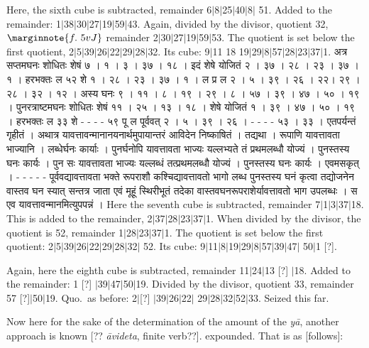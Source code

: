 \documentclass[11pt,a5paper]{book}
\def\ya{\textit{y\=a}}
\def\danda{$|$}
\begin{document}
{Here, the sixth cube is subtracted, remainder 6\danda 8\danda 25\danda 40\danda 8\danda
51. Added to the remainder: 1\danda 38\danda 30\danda 27\danda 19\danda 59\danda 43. Again, divided 
by the divisor, quotient 32,
$\marginnote{f.~5v J}$
remainder 2\danda 30\danda 27\danda 19\danda 59\danda 53. The quotient is set below the first
quotient, 2\danda 5\danda 39\danda 26\danda 22\danda 29\danda 28\danda 32. Its cube: 
9\danda 11 18 19\danda 29\danda 8\danda 57\danda 28\danda 23\danda 37\danda 1.
\newpage
{\s अत्र सप्तमघनः शोधितः शेषं ७ । १ । ३ । ३७ । १८ । 
इदं शेषे योजितं २ । ३७ । २८ । २३ । ३७ । १ । 
हरभक्तः ल ५२ शे १ । २८ । २३ । ३७ । १ । ल प्र ल २ । ५ । ३९ । २६ । २२। २९ । २८ । ३२ । १२ । 
अस्य घनः ९ । ११ । ८ । १९ । २९ । ८ । ५७ । ३९ । ४७ । ५० । १९ । 
पुनरत्राष्टमघनः शोधितः शेषं ११ । २५ । १३ । १८ । 
शेषे योजितं १ । ३९ । ४७ । ५० । १९ । 
हरभक्तः ल ३३ शे - - - - ५९ पू ल पूर्ववत् २ । ५ । ३९ । २६ । - - - - ५३ । ३३ । 
एतपर्यन्तं गृहीतं । अथात्र यावत्तावन्मानानयनार्थमुपायान्तरं आविदेन निष्काषितं । तद्यथा । 
रूपाणि यावत्तावता भाज्यानि । लब्धेर्घनः कार्याः । पुनर्घनोपि यावत्तावता भाज्यः यल्लभ्यते तं प्रथमलब्धौ योज्यं । 
पुनस्तस्य घनः कार्यः । पुन सः यावत्तावता भाज्यः यल्लब्धं तत्प्रथमलब्धौ योज्यं । पुनस्तस्य घनः कार्यः । 
एवमसकृत् । - - - - - पूर्ववद्यावत्तावता भक्ते रूपराशौ कश्चिद्यावत्तावतो भागो लब्ध
पुनस्तस्य घनं कृत्वा तद्योजनेन वास्तव घन स्यात् सन्तत्र जाता एवं मूहूं स्थिरीभूतं तदेका 
वास्तवघनरूपराशेर्यावत्तावतो भाग उपलब्धः । स एव यावत्तावन्मानमित्युपपन्नं । }
\newpage
Here the seventh cube is subtracted, remainder 7\danda 1\danda 3\danda 37\danda 18. 
This is added to the remainder, 2\danda 37\danda 28\danda 23\danda 37\danda 1.
When divided by the divisor, the quotient is 52, remainder 
1\danda 28\danda 23\danda 37\danda 1. The quotient 
is set below the first quotient: 2\danda 5\danda 39\danda 26\danda 22\danda 29\danda 28\danda 32\danda
52. Its cube: 9\danda 11\danda 8\danda 19\danda 29\danda 8\danda 57\danda 39\danda 47\danda
50\danda 1 [?]. 

Again, here the eighth cube is subtracted, remainder 11\danda 24\danda 13 [?] \danda 18. Added to the
remainder: 1 [?] \danda 39\danda 47\danda 50\danda 19. Divided by the divisor, quotient 33, 
remainder 57 [?]\danda 50\danda 19. Quo.\ as before: 2\danda [?] \danda 39\danda 26\danda 22\danda
29\danda 28\danda 32\danda 52\danda 33. Seized this far. 

Now here for the sake of the determination of the amount of the \ya, another approach is known 
[?? \textit{\=avideta}, finite verb??]. 
expounded. That is as [follows]: 

}
\end{document}
